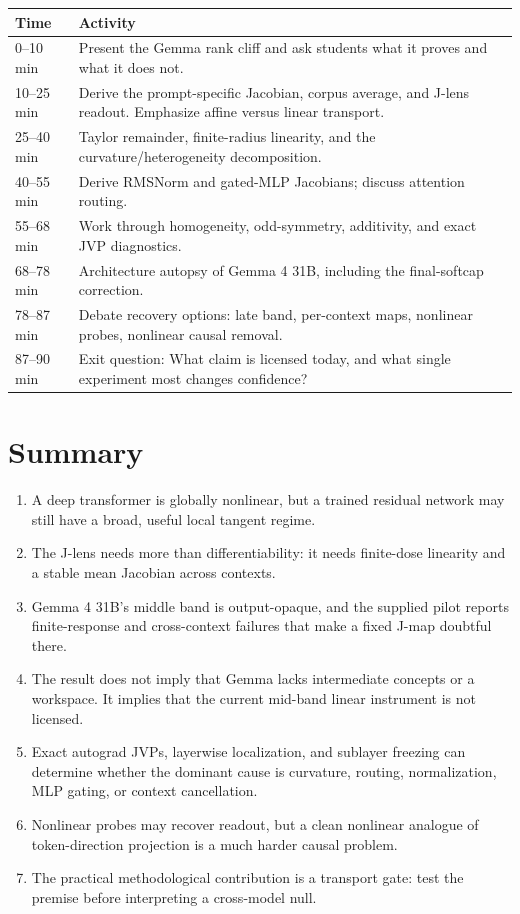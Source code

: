\documentclass[11pt]{article}
\theoremstyle{definition}
\theoremstyle{remark}
\begin{document}
\begin{tabularx}{\textwidth}{@{}p{}X@{}}
\toprule
\textbf{Time} & \textbf{Activity}\\
\midrule
0--10 min & Present the Gemma rank cliff and ask students what it proves and what it does not.\\
10--25 min & Derive the prompt-specific Jacobian, corpus average, and J-lens readout. Emphasize affine versus linear transport.\\
25--40 min & Taylor remainder, finite-radius linearity, and the curvature/heterogeneity decomposition.\\
40--55 min & Derive RMSNorm and gated-MLP Jacobians; discuss attention routing.\\
55--68 min & Work through homogeneity, odd-symmetry, additivity, and exact JVP diagnostics.\\
68--78 min & Architecture autopsy of Gemma 4 31B, including the final-softcap correction.\\
78--87 min & Debate recovery options: late band, per-context maps, nonlinear probes, nonlinear causal removal.\\
87--90 min & Exit question: What claim is licensed today, and what single experiment most changes confidence?\\
\bottomrule
\end{tabularx}

\section{Summary}

\begin{takeawaybox}
\begin{enumerate}
  \item A deep transformer is globally nonlinear, but a trained residual network may still have a broad, useful local tangent regime.
  \item The J-lens needs more than differentiability: it needs finite-dose linearity and a stable mean Jacobian across contexts.
  \item Gemma 4 31B's middle band is output-opaque, and the supplied pilot reports finite-response and cross-context failures that make a fixed J-map doubtful there.
  \item The result does not imply that Gemma lacks intermediate concepts or a workspace. It implies that the current mid-band linear instrument is not licensed.
  \item Exact autograd JVPs, layerwise localization, and sublayer freezing can determine whether the dominant cause is curvature, routing, normalization, MLP gating, or context cancellation.
  \item Nonlinear probes may recover readout, but a clean nonlinear analogue of token-direction projection is a much harder causal problem.
  \item The practical methodological contribution is a transport gate: test the premise before interpreting a cross-model null.
\end{enumerate}
\end{takeawaybox}
\end{document}
